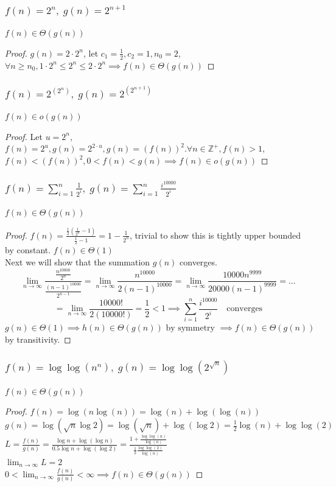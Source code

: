 \documentclass[9pt]{extarticle}
\begin{document}
\subsubsection{$f(n) = 2^n,\; g(n) = 2^{n+1}$}
$f(n) \in \Theta(g(n))$
\begin{proof}
    $g(n) = 2\cdot 2^n$, let $c_1 = \frac{1}{2}, c_2 = 1, n_0 = 2$, \\
    $\forall n \geq n_0, 1 \cdot 2^n \leq 2^n \leq 2\cdot 2^n \implies f(n) \in \Theta(g(n))$
\end{proof}
\subsubsection{$f(n) = 2^{(2^n)},\; g(n) = 2^{(2^{n+1})}$}
$f(n) \in o(g(n))$
\begin{proof}
    Let $u = 2^n$, $f(n) = 2^u, g(n) = 2^{2\cdot u}, g(n) = (f(n))^2. \forall n \in \mathbb{Z}^+, f(n) > 1$,\\
    $f(n) < (f(n))^2, 0 < f(n) < g(n) \implies f(n) \in o(g(n))$
\end{proof}
\subsubsection{$f(n) = \sum_{i=1}^n \frac{1}{2^i},\; g(n) = \sum_{i=1}^n \frac{i^{10000}}{2^i}$}
$f(n) \in \Theta(g(n))$
\begin{proof}
   $f(n) = \frac{\frac{1}{2}(\frac{1}{2^n} -1)}{\frac{1}{2} - 1} = 1 - \frac{1}{2^n}$, 
   trivial to show this is tightly upper bounded by constant. $f(n) \in \Theta(1)$\\
   Next we will show that the summation $g(n)$ converges. \\
   \[\lim_{n \rightarrow \infty} \frac{\frac{n^{10000}}{2^n}}{\frac{(n-1)^{10000}}{2^{n-1}}} 
   = \lim_{n \rightarrow \infty} \frac{n^{10000}}{2(n-1)^{10000}} = \lim_{n \rightarrow \infty} \frac{10000 n^{9999}}{20000(n-1)^{9999}} = \dots\]
   \[= \lim_{n \rightarrow \infty} \frac{10000!}{2(10000!)} = \frac{1}{2} < 1 \implies \sum_{i=1}^n \frac{i^{10000}}{2^i} \quad \text{converges}\]
   $g(n) \in \Theta(1) \implies h(n) \in \Theta(g(n)) \text{ by symmetry }\implies f(n) \in \Theta(g(n))$ by transitivity.
\end{proof}

\subsubsection{$f(n) = \log\log (n^n),\; g(n) = \log\log(2^{\sqrt{n}})$}
$f(n) \in \Theta(g(n))$
\begin{proof}
    $f(n) = \log(n \log(n )) = \log(n) + \log(\log(n))$\\
    $g(n) = \log(\sqrt{n}\log 2) = \log(\sqrt{n}) + \log(\log2) = \frac{1}{2}\log(n) + \log\log(2)$\\
    $L = \frac{f(n)}{g(n)} = \frac{\log n + \log(\log n)}{0.5 \log n + \log (\log 2)} = 
    \frac{1 + \frac{\log\log(n)}{\log(n)}}{\frac{1}{2} \frac{\log\log(2)}{\log(n)}}$\\
    $\lim_{n\rightarrow \infty} L = 2$\\
    $0 < \lim_{n \rightarrow \infty} \frac{f(n)}{g(n)} < \infty \implies f(n) \in \Theta(g(n))$
\end{proof}
\end{document}
